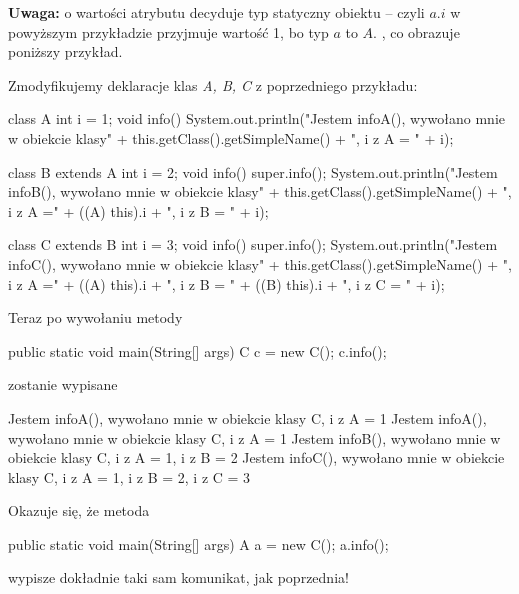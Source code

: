\textbf{Uwaga:} o wartości atrybutu decyduje typ statyczny obiektu -- czyli $a.i$ w powyższym przykładzie przyjmuje wartość 1, bo typ $a$ to $A$. , co obrazuje poniższy przykład.

\begin{example}
    Zmodyfikujemy deklaracje klas \textit{A, B, C} z poprzedniego przykładu:
    \begin{java}
        class A {
            int i = 1;
            void info() {
                System.out.println("Jestem infoA(), wywołano mnie w obiekcie klasy" +
                        this.getClass().getSimpleName() + ", i z A = " + i);
            }
        }
    
        class B extends A {
            int i = 2;
            void info() {
                super.info();
                System.out.println("Jestem infoB(), wywołano mnie w obiekcie klasy" +
                        this.getClass().getSimpleName() + ", i z A =" + ((A) this).i +
                        ", i z B = " + i);
            }
        }
    
        class C extends B {
            int i = 3;
            void info() {
                super.info();
                System.out.println("Jestem infoC(), wywołano mnie w obiekcie klasy" +
                        this.getClass().getSimpleName() + ", i z A =" + ((A) this).i +
                        ", i z B = " + ((B) this).i + ", i z C = " + i);
            }
        }
    \end{java}

    Teraz po wywołaniu metody
    \begin{java}
        public static void main(String[] args) {
            C c = new C();
            c.info();
        }
    \end{java}
    zostanie wypisane
    \begin{plain}
        Jestem infoA(), wywołano mnie w obiekcie klasy C, i z A = 1
        Jestem infoA(), wywołano mnie w obiekcie klasy C, i z A = 1
        Jestem infoB(), wywołano mnie w obiekcie klasy C, i z A = 1, i z B = 2
        Jestem infoC(), wywołano mnie w obiekcie klasy C, i z A = 1, i z B = 2, i z C = 3
    \end{plain}

    Okazuje się, że metoda
    \begin{java}
        public static void main(String[] args) {
            A a = new C();
            a.info();
        }
    \end{java}
    wypisze dokładnie taki sam komunikat, jak poprzednia!
\end{example}

